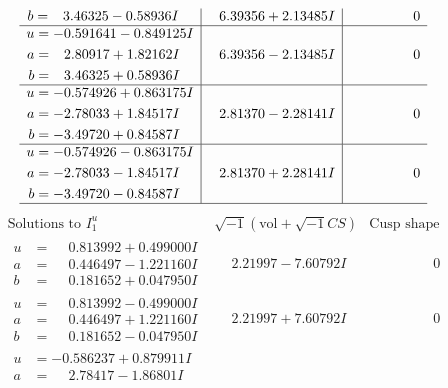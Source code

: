 \documentclass[1p]{elsarticle_modified}
\theoremstyle{definition}
\newcommand{\I}{\sqrt{-1}}
\begin{document}
$$\begin{array}{c|c|c}
\begin{aligned}
b &= \phantom{-}3.46325 - 0.58936 I\end{aligned}
 & \phantom{-}6.39356 + 2.13485 I & \phantom{-0.000000 } 0 \\ \hline\begin{aligned}
u &= -0.591641 - 0.849125 I \\
a &= \phantom{-}2.80917 + 1.82162 I \\
b &= \phantom{-}3.46325 + 0.58936 I\end{aligned}
 & \phantom{-}6.39356 - 2.13485 I & \phantom{-0.000000 } 0 \\ \hline\begin{aligned}
u &= -0.574926 + 0.863175 I \\
a &= -2.78033 + 1.84517 I \\
b &= -3.49720 + 0.84587 I\end{aligned}
 & \phantom{-}2.81370 - 2.28141 I & \phantom{-0.000000 } 0 \\ \hline\begin{aligned}
u &= -0.574926 - 0.863175 I \\
a &= -2.78033 - 1.84517 I \\
b &= -3.49720 - 0.84587 I\end{aligned}
 & \phantom{-}2.81370 + 2.28141 I & \phantom{-0.000000 } 0\\
 \hline 
 \end{array}$$\newpage$$\begin{array}{c|c|c}  
\text{Solutions to }I^u_{1}& \I (\text{vol} + \sqrt{-1}CS) & \text{Cusp shape}\\
 \hline 
\begin{aligned}
u &= \phantom{-}0.813992 + 0.499000 I \\
a &= \phantom{-}0.446497 - 1.221160 I \\
b &= \phantom{-}0.181652 + 0.047950 I\end{aligned}
 & \phantom{-}2.21997 - 7.60792 I & \phantom{-0.000000 } 0 \\ \hline\begin{aligned}
u &= \phantom{-}0.813992 - 0.499000 I \\
a &= \phantom{-}0.446497 + 1.221160 I \\
b &= \phantom{-}0.181652 - 0.047950 I\end{aligned}
 & \phantom{-}2.21997 + 7.60792 I & \phantom{-0.000000 } 0 \\ \hline\begin{aligned}
u &= -0.586237 + 0.879911 I \\
a &= \phantom{-}2.78417 - 1.86801 I \\

\end{aligned}
\end{array}$$
\end{document}
